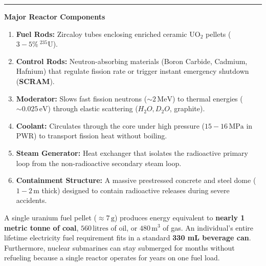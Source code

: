 \documentclass[11pt,a4paper]{article}
\newcommand{\concept}[1]{%
  \vspace{3pt}\noindent\textcolor{AnthGreen}{\rule{3.5pt}{10pt}}\enspace
  \textbf{\sffamily\color{AnthDark}#1}\par\vspace{2pt}%
}
\newenvironment{Tip}[1][Key Engineering Insight]{\begin{tcolorbox}[tipbox, title=#1]}{\end{tcolorbox}}
\begin{document}
\concept{Major Reactor Components}
\begin{enumerate}
  \item \textbf{Fuel Rods:} Zircaloy tubes enclosing enriched ceramic $\text{UO}_2$ pellets ($3-5\%\ {}^{235}\text{U}$).
  \item \textbf{Control Rods:} Neutron-absorbing materials (Boron Carbide, Cadmium, Hafnium) that regulate fission rate or trigger instant emergency shutdown (\textbf{SCRAM}).
  \item \textbf{Moderator:} Slows fast fission neutrons ($\sim 2\,\text{MeV}$) to thermal energies ($\sim 0.025\,\text{eV}$) through elastic scattering ($H_2O, D_2O$, graphite).
  \item \textbf{Coolant:} Circulates through the core under high pressure ($15-16\,\text{MPa}$ in PWR) to transport fission heat without boiling.
  \item \textbf{Steam Generator:} Heat exchanger that isolates the radioactive primary loop from the non-radioactive secondary steam loop.
  \item \textbf{Containment Structure:} A massive prestressed concrete and steel dome ($1-2\,\text{m}$ thick) designed to contain radioactive releases during severe accidents.
\end{enumerate}

\begin{Tip}[Fuel Energy Density \& Submarine Endurance]
A single uranium fuel pellet ($\approx 7\,\text{g}$) produces energy equivalent to \textbf{nearly 1 metric tonne of coal}, $560\,\text{litres}$ of oil, or $480\,\text{m}^3$ of gas. An individual's entire lifetime electricity fuel requirement fits in a standard \textbf{330 mL beverage can}. Furthermore, nuclear submarines can stay submerged for months without refueling because a single reactor operates for years on one fuel load.
\end{Tip}
\end{document}
